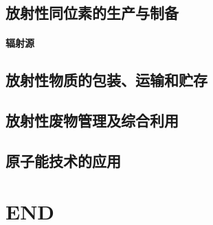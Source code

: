 \documentclass[UTF8]{../../ApplicationUniverse}
\begin{document}
\section{放射性同位素的生产与制备}
    \subsubsection{辐射源}
\section{放射性物质的包装、运输和贮存}
\section{放射性废物管理及综合利用}
\section{原子能技术的应用}




\chapter{END}
\end{document}
